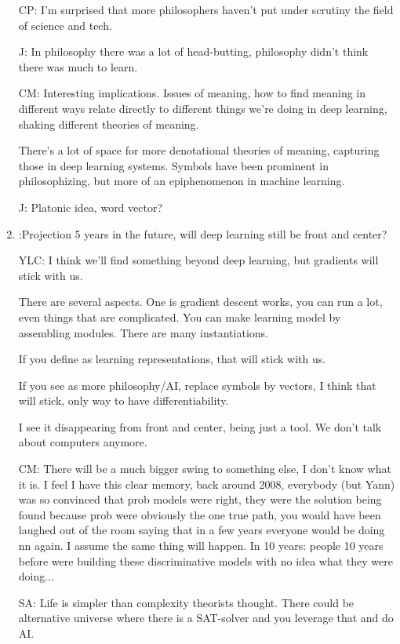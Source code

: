\begin{enumerate}
CP: I'm surprised that more philosophers haven't put under scrutiny the field of science and tech.

J: In philosophy there was a lot of head-butting, philosophy didn't think there was much to learn.

CM: Interesting implications. Issues of meaning, how to find meaning in different ways relate directly to different things we're doing in deep learning, shaking different theories of meaning. 

There's a lot of space for more denotational theories of meaning, capturing those in deep learning systems. Symbols have been prominent in philosophizing, but more of an epiphenomenon in machine learning.

J: Platonic idea, word vector?

\item
:Projection 5 years in the future, will deep learning still be front and center?

YLC: I think we'll find something beyond deep learning, but gradients will stick with us. 

There are several aspects. One is gradient descent works, you can run a lot, even things that are complicated. You can make learning model by assembling modules. There are many instantiations.

If you define as learning representations, that will stick with us. 

If you see as more philosophy/AI, replace symbols by vectors, I think that will stick, only way to have differentiability.

I see it disappearing from front and center, being just a tool. We don't talk about computers anymore.

CM: There will be a much bigger swing to something else, I don't know what it is. I feel I have this clear memory, back around 2008, everybody (but Yann) was so convinced that prob models were right, they were the solution being found because prob were obviously the one true path, you would have been laughed out of the room saying that in a few years everyone would be doing nn again. I assume the same thing will happen. In 10 years: people 10 years before were building these discriminative models with no idea what they were doing...

SA: Life is simpler than complexity theorists thought. There could be alternative universe where there is a SAT-solver and you leverage that and do AI.


\end{enumerate}
